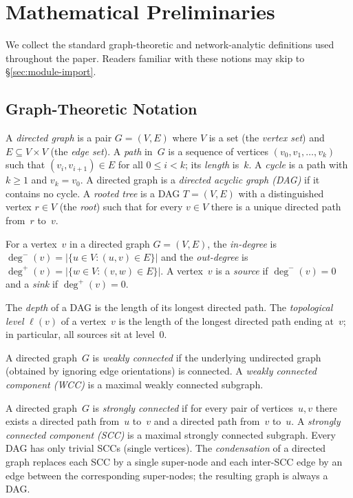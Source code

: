 \section{Mathematical Preliminaries}
\label{sec:preliminaries}

We collect the standard graph-theoretic and network-analytic definitions used throughout the paper. Readers familiar with these notions may skip to \S\ref{sec:module-import}.

\subsection{Graph-Theoretic Notation}
\label{sec:prelim-graph}

A \emph{directed graph} is a pair $G = (V, E)$ where $V$ is a set (the \emph{vertex set}) and $E \subseteq V \times V$ (the \emph{edge set}). A \emph{path} in~$G$ is a sequence of vertices $(v_0, v_1, \ldots, v_k)$ such that $(v_i, v_{i+1}) \in E$ for all $0 \le i < k$; its \emph{length} is~$k$. A \emph{cycle} is a path with $k \ge 1$ and $v_k = v_0$. A directed graph is a \emph{directed acyclic graph (DAG)} if it contains no cycle. A \emph{rooted tree} is a DAG $T = (V, E)$ with a distinguished vertex $r \in V$ (the \emph{root}) such that for every $v \in V$ there is a unique directed path from~$r$ to~$v$.

For a vertex~$v$ in a directed graph $G = (V, E)$, the \emph{in-degree} is $\deg^{-}(v) = |\{u \in V : (u, v) \in E\}|$ and the \emph{out-degree} is $\deg^{+}(v) = |\{w \in V : (v, w) \in E\}|$. A vertex~$v$ is a \emph{source} if $\deg^{-}(v) = 0$ and a \emph{sink} if $\deg^{+}(v) = 0$.

The \emph{depth} of a DAG is the length of its longest directed path. The \emph{topological level} $\ell(v)$ of a vertex~$v$ is the length of the longest directed path ending at~$v$; in particular, all sources sit at level~$0$.

A directed graph~$G$ is \emph{weakly connected} if the underlying undirected graph (obtained by ignoring edge orientations) is connected. A \emph{weakly connected component (WCC)} is a maximal weakly connected subgraph.

A directed graph~$G$ is \emph{strongly connected} if for every pair of vertices~$u, v$ there exists a directed path from~$u$ to~$v$ and a directed path from~$v$ to~$u$. A \emph{strongly connected component (SCC)} is a maximal strongly connected subgraph. Every DAG has only trivial SCCs (single vertices). The \emph{condensation} of a directed graph replaces each SCC by a single super-node and each inter-SCC edge by an edge between the corresponding super-nodes; the resulting graph is always a DAG.

